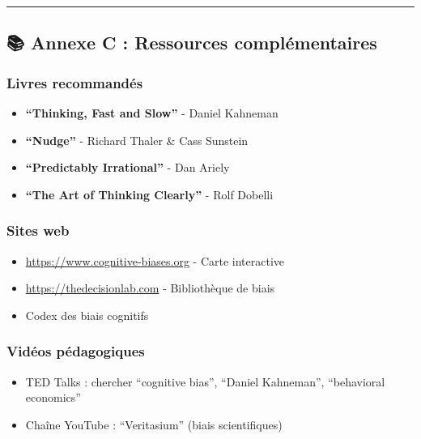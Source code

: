 \documentclass[
]{article}
\providecommand{\tightlist}{%
  \setlength{\itemsep}{0pt}\setlength{\parskip}{0pt}}
\begin{document}
\begin{center}\rule{0.5\linewidth}{0.5pt}\end{center}

\subsection{📚 Annexe C : Ressources
complémentaires}\label{annexe-c-ressources-compluxe9mentaires}

\subsubsection{Livres recommandés}\label{livres-recommanduxe9s}

\begin{itemize}
\tightlist
\item
  \textbf{``Thinking, Fast and Slow''} - Daniel Kahneman
\item
  \textbf{``Nudge''} - Richard Thaler \& Cass Sunstein
\item
  \textbf{``Predictably Irrational''} - Dan Ariely
\item
  \textbf{``The Art of Thinking Clearly''} - Rolf Dobelli
\end{itemize}

\subsubsection{Sites web}\label{sites-web}

\begin{itemize}
\tightlist
\item
  \url{https://www.cognitive-biases.org} - Carte interactive
\item
  \url{https://thedecisionlab.com} - Bibliothèque de biais
\item
  Codex des biais cognitifs
\end{itemize}

\subsubsection{Vidéos pédagogiques}\label{viduxe9os-puxe9dagogiques}

\begin{itemize}
\tightlist
\item
  TED Talks : chercher ``cognitive bias'', ``Daniel Kahneman'',
  ``behavioral economics''
\item
  Chaîne YouTube : ``Veritasium'' (biais scientifiques)
\end{itemize}
\end{document}
